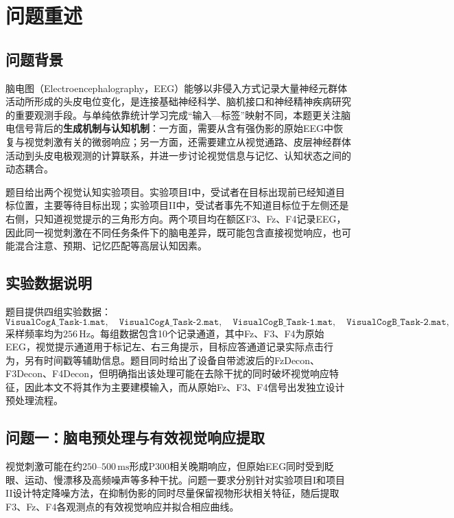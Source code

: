 \section{问题重述}

\subsection{问题背景}

脑电图（Electroencephalography，EEG）能够以非侵入方式记录大量神经元群体活动所形成的头皮电位变化，是连接基础神经科学、脑机接口和神经精神疾病研究的重要观测手段。与单纯依靠统计学习完成“输入—标签”映射不同，本题更关注脑电信号背后的\textbf{生成机制与认知机制}：一方面，需要从含有强伪影的原始EEG中恢复与视觉刺激有关的微弱响应；另一方面，还需要建立从视觉通路、皮层神经群体活动到头皮电极观测的计算联系，并进一步讨论视觉信息与记忆、认知状态之间的动态耦合。

题目给出两个视觉认知实验项目。实验项目I中，受试者在目标出现前已经知道目标位置，主要等待目标出现；实验项目II中，受试者事先不知道目标位于左侧还是右侧，只知道视觉提示的三角形方向。两个项目均在额区F3、Fz、F4记录EEG，因此同一视觉刺激在不同任务条件下的脑电差异，既可能包含直接视觉响应，也可能混合注意、预期、记忆匹配等高层认知因素。

\subsection{实验数据说明}

题目提供四组实验数据：
\[
\texttt{VisualCogA\_Task-1.mat},\quad
\texttt{VisualCogA\_Task-2.mat},\quad
\texttt{VisualCogB\_Task-1.mat},\quad
\texttt{VisualCogB\_Task-2.mat},
\]
采样频率均为$256\,\mathrm{Hz}$。每组数据包含10个记录通道，其中Fz、F3、F4为原始EEG，视觉提示通道用于标记左、右三角提示，目标应答通道记录实际点击行为，另有时间戳等辅助信息。题目同时给出了设备自带滤波后的FzDecon、F3Decon、F4Decon，但明确指出该处理可能在去除干扰的同时破坏视觉响应特征，因此本文不将其作为主要建模输入，而从原始Fz、F3、F4信号出发独立设计预处理流程。

\subsection{问题一：脑电预处理与有效视觉响应提取}

视觉刺激可能在约$250$--$500\,\mathrm{ms}$形成P300相关晚期响应，但原始EEG同时受到眨眼、运动、慢漂移及高频噪声等多种干扰。问题一要求分别针对实验项目I和项目II设计特定降噪方法，在抑制伪影的同时尽量保留视物形状相关特征，随后提取F3、Fz、F4各观测点的有效视觉响应并拟合相应曲线。

